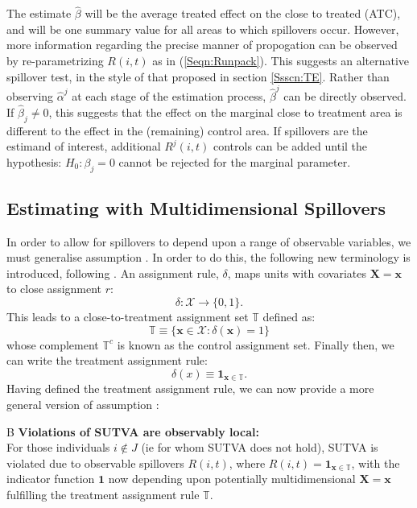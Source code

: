 The estimate $\hat\beta$ will be the average treated effect on the close to treated
(ATC), and will be one summary value for all areas to which spillovers occur.  
However, more information regarding the precise manner of propogation can be observed
by re-parametrizing $R(i,t)$ as in (\ref{Seqn:Runpack}).  This suggests an 
alternative spillover test, in the style of that proposed in section \ref{Ssscn:TE}.
Rather than observing $\hat\alpha^j$ at each stage of the estimation process, 
$\hat\beta^j$ can be directly observed.  If $\hat\beta_j\neq 0$, this suggests that
the effect on the marginal close to treatment area is different to the effect in 
the (remaining) control area.  If spillovers are the estimand of interest, 
additional $R^j(i,t)$ controls can be added until the hypothesis: $H_0: \beta_j = 0$ 
cannot be rejected for the marginal parameter.

\subsection{Estimating with Multidimensional Spillovers}
\label{Ssscn:multi}
In order to allow for spillovers to depend upon a range of observable variables,
we must generalise assumption .  In order to do this, the
following new terminology is introduced, following \citet{Zajonc2012}. An 
assignment rule, $\delta$, maps units with covariates $\mathbf{X=x}$ to close
assignment $r$:
\[
\delta: \mathcal{X} \rightarrow \{0,1\}.
\]
This leads to a close-to-treatment assignment set $\mathbb{T}$ defined as:
\[
\mathbb{T}\equiv \{ \mathbf{x}\in\mathcal{X}: \delta(\mathbf{x})=1 \}
\]
whose complement $\mathbb{T}^c$ is known as the control assignment
set. Finally then, we can write the treatment assignment rule:
\begin{equation}
\delta(x)\equiv \mathbf{1}_{\mathbf{x}\in\mathbb{T}}.
\end{equation}
Having defined the treatment assignment rule, we can now provide a
more general version of assumption :

\begin{assumption}{4}{B}
\label{Sass:SUTVAlM}
\textbf{Violations of SUTVA are observably local:} \\ 
For those individuals $i\notin J$ (ie for whom SUTVA does not hold), SUTVA is
violated due to observable spillovers $R(i,t)$, where 
$R(i,t)=\mathbf{1}_{\mathbf{x}\in \mathbb{T}}$, with the indicator function 
$\mathbf{1}$ now depending upon potentially multidimensional
$\mathbf{X=x}$
fulfilling the treatment assignment rule $\mathbb{T}$.
\end{assumption}

